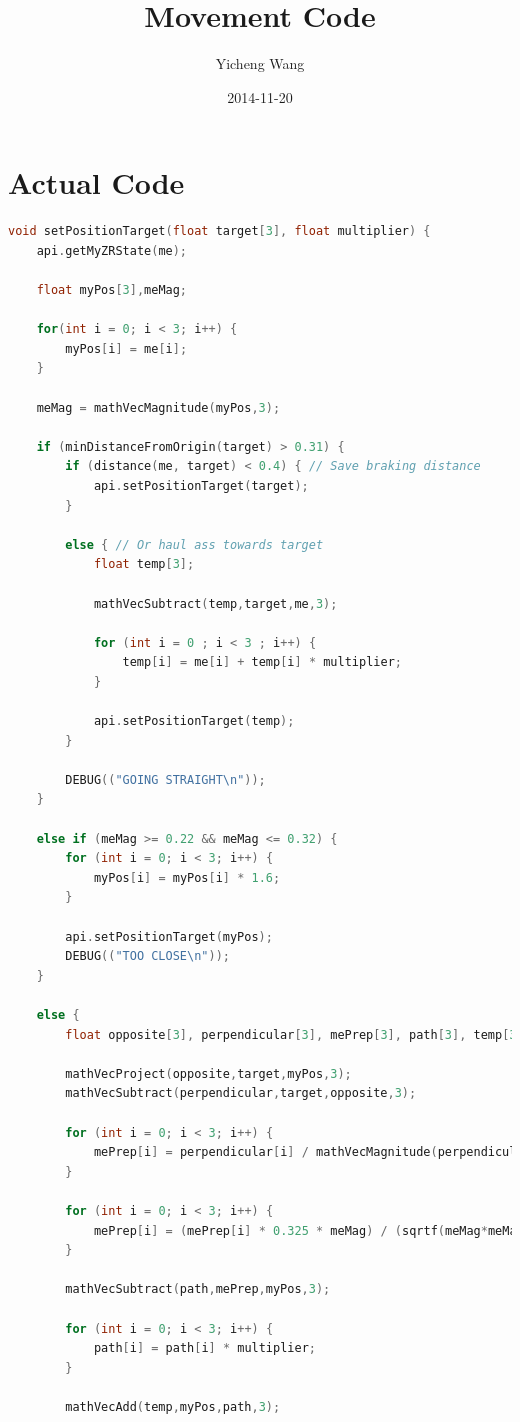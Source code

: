 \documentclass [12 pt, twoside] {article}
\begin{document}
\title{Movement Code}
\author{Yicheng Wang}
\date{2014-11-20}
\maketitle

\section{Actual Code}
\begin{lstlisting}[language=C++]
void setPositionTarget(float target[3], float multiplier) {
	api.getMyZRState(me);
	
	float myPos[3],meMag;
	
	for(int i = 0; i < 3; i++) {
		myPos[i] = me[i];
	}
	
	meMag = mathVecMagnitude(myPos,3);
	
	if (minDistanceFromOrigin(target) > 0.31) {
		if (distance(me, target) < 0.4) { // Save braking distance
			api.setPositionTarget(target);
		}

		else { // Or haul ass towards target
			float temp[3];

			mathVecSubtract(temp,target,me,3);
			
			for (int i = 0 ; i < 3 ; i++) {
				temp[i] = me[i] + temp[i] * multiplier;
			}

			api.setPositionTarget(temp);
		}

		DEBUG(("GOING STRAIGHT\n"));
	}
	
	else if (meMag >= 0.22 && meMag <= 0.32) {
		for (int i = 0; i < 3; i++) {
			myPos[i] = myPos[i] * 1.6;
		}
		
		api.setPositionTarget(myPos);
		DEBUG(("TOO CLOSE\n"));
	}
	
	else {
		float opposite[3], perpendicular[3], mePrep[3], path[3], temp[3];
		
		mathVecProject(opposite,target,myPos,3);
		mathVecSubtract(perpendicular,target,opposite,3);
		
		for (int i = 0; i < 3; i++) {
		    mePrep[i] = perpendicular[i] / mathVecMagnitude(perpendicular,3);
		}
		
		for (int i = 0; i < 3; i++) {
			mePrep[i] = (mePrep[i] * 0.325 * meMag) / (sqrtf(meMag*meMag - 0.32*0.32));
		}
		
		mathVecSubtract(path,mePrep,myPos,3);
		
		for (int i = 0; i < 3; i++) {
			path[i] = path[i] * multiplier;
		}
		
		mathVecAdd(temp,myPos,path,3);


\end{lstlisting}
\end{document}

